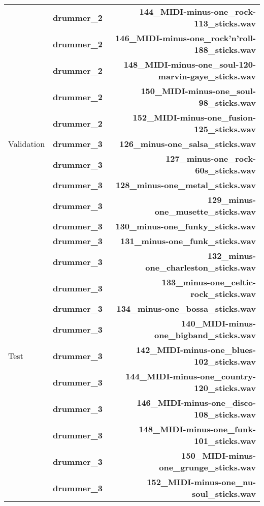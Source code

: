 \begin{table}[H]
\begin{tabular}{l|lr}
            & \textbf{drummer\_2} & \textbf{144\_MIDI-minus-one\_rock-113\_sticks.wav} \\
            & \textbf{drummer\_2} & \textbf{146\_MIDI-minus-one\_rock'n'roll-188\_sticks.wav} \\
            & \textbf{drummer\_2} & \textbf{148\_MIDI-minus-one\_soul-120-marvin-gaye\_sticks.wav} \\
            & \textbf{drummer\_2} & \textbf{150\_MIDI-minus-one\_soul-98\_sticks.wav} \\
            & \textbf{drummer\_2} & \textbf{152\_MIDI-minus-one\_fusion-125\_sticks.wav} \\
        Validation & \textbf{drummer\_3} & \textbf{126\_minus-one\_salsa\_sticks.wav} \\
            & \textbf{drummer\_3} & \textbf{127\_minus-one\_rock-60s\_sticks.wav} \\
            & \textbf{drummer\_3} & \textbf{128\_minus-one\_metal\_sticks.wav} \\
            & \textbf{drummer\_3} & \textbf{129\_minus-one\_musette\_sticks.wav} \\
            & \textbf{drummer\_3} & \textbf{130\_minus-one\_funky\_sticks.wav} \\
            & \textbf{drummer\_3} & \textbf{131\_minus-one\_funk\_sticks.wav} \\
            & \textbf{drummer\_3} & \textbf{132\_minus-one\_charleston\_sticks.wav} \\
            & \textbf{drummer\_3} & \textbf{133\_minus-one\_celtic-rock\_sticks.wav} \\
            & \textbf{drummer\_3} & \textbf{134\_minus-one\_bossa\_sticks.wav} \\
            & \textbf{drummer\_3} & \textbf{140\_MIDI-minus-one\_bigband\_sticks.wav} \\
        Test & \textbf{drummer\_3} & \textbf{142\_MIDI-minus-one\_blues-102\_sticks.wav} \\
            & \textbf{drummer\_3} & \textbf{144\_MIDI-minus-one\_country-120\_sticks.wav} \\
            & \textbf{drummer\_3} & \textbf{146\_MIDI-minus-one\_disco-108\_sticks.wav} \\
            & \textbf{drummer\_3} & \textbf{148\_MIDI-minus-one\_funk-101\_sticks.wav} \\
            & \textbf{drummer\_3} & \textbf{150\_MIDI-minus-one\_grunge\_sticks.wav} \\
            & \textbf{drummer\_3} & \textbf{152\_MIDI-minus-one\_nu-soul\_sticks.wav} \\

\end{tabular}
\end{table}
